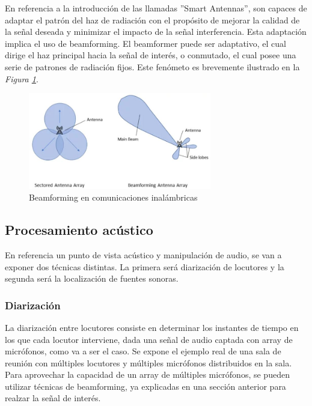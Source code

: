 \documentclass[a4paper,11pt]{book}
\begin{document}
		En referencia a la introducción de las llamadas ''Smart Antennas'', son capaces de adaptar el patrón del haz de radiación con el propósito de mejorar la calidad de la señal deseada y minimizar el impacto de la señal interferencia. Esta adaptación implica el uso de beamforming. El beamformer puede ser adaptativo, el cual dirige el haz principal hacia la señal de interés, o conmutado, el cual posee una serie de patrones de radiación fijos. Este fenómeto es brevemente ilustrado en la \textit{Figura \ref{BEAM}}.
		\begin{figure}[hbtp]
		\centering
		\includegraphics[width = 8cm]{FIGURAS/beamformer_adaptativo.JPG}
		\caption{Beamforming en comunicaciones inalámbricas}
		\label{BEAM}
		\end{figure}
		
		\subsection{Procesamiento acústico}
		En referencia un punto de vista acústico y manipulación de audio, se van a exponer dos técnicas distintas. La primera será diarización de locutores y la segunda será la localización de fuentes sonoras.
			\subsubsection{Diarización}
			La diarización entre locutores consiste en determinar los instantes de tiempo en los que cada locutor interviene, dada una señal de audio captada con array de micrófonos, como va a ser el caso. Se expone el ejemplo real de una sala de reunión con múltiples locutores y múltiples micrófonos distribuidos en la sala. Para aprovechar la capacidad de un array de múltiples micrófonos, se pueden utilizar técnicas de beamforming, ya explicadas en una sección anterior para realzar la señal de interés.
			
\end{document}
